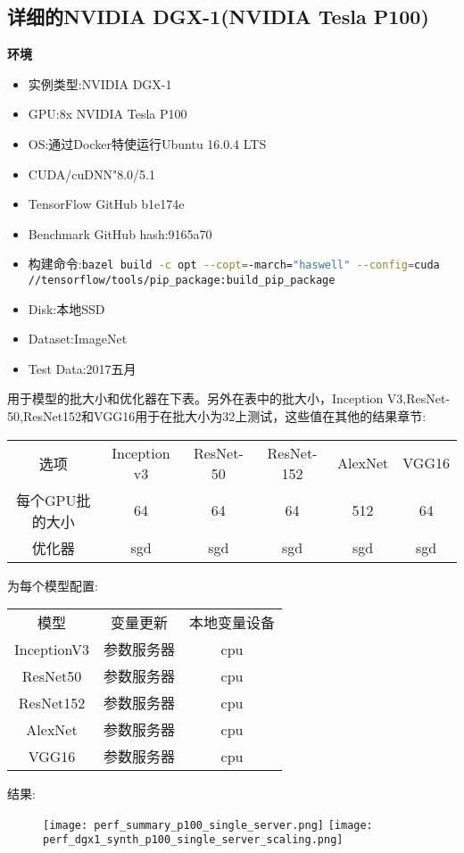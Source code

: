 \subsection{详细的NVIDIA DGX-1(NVIDIA Tesla P100)}
\textbf{环境}\newline
\begin{itemize}
	\item 实例类型:NVIDIA DGX-1
	\item GPU:8x NVIDIA Tesla P100
	\item OS:通过Docker特使运行Ubuntu 16.0.4 LTS 
	\item CUDA/cuDNN"8.0/5.1
	\item TensorFlow GitHub b1e174e
	\item Benchmark GitHub hash:9165a70
	\item 构建命令:\lstinline[language=Bash]{bazel build -c opt --copt=-march="haswell" --config=cuda //tensorflow/tools/pip_package:build_pip_package}
	\item Disk:本地SSD
	\item Dataset:ImageNet
	\item Test Data:2017五月
\end{itemize}
用于模型的批大小和优化器在下表。另外在表中的批大小，Inception V3,ResNet-50,ResNet152和VGG16用于在批大小为32上测试，这些值在其他的结果章节:
\begin{table}[H]
	\begin{tabular}{|c|c|c|c|c|c|}
		选项&Inception v3&ResNet-50&ResNet-152&AlexNet&VGG16\\
		每个GPU批的大小&64&64&64&512&64\\
		优化器&sgd&sgd&sgd&sgd&sgd\\
	\end{tabular}
\end{table}
为每个模型配置:
\begin{table}[H]
	\begin{tabular}{|c|c|c|}
	模型&变量更新&本地变量设备\\
		InceptionV3 &参数服务器&cpu\\
		ResNet50 &参数服务器&cpu\\
		ResNet152 &参数服务器&cpu\\
		AlexNet &参数服务器&cpu\\
		VGG16 &参数服务器&cpu\\
	\end{tabular}
\end{table}
结果:
\begin{figure}[H]
	\texttt{[image: perf\_summary\_p100\_single\_server.png]}
	\texttt{[image: perf\_dgx1\_synth\_p100\_single\_server\_scaling.png]}
\end{figure}
